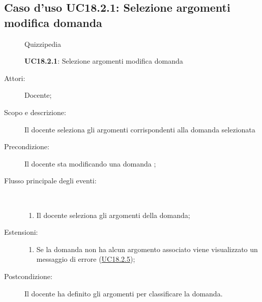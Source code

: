 \subsection{Caso d'uso UC18.2.1: Selezione argomenti modifica domanda}
\begin{figure}[H]
	\centering
	\begin{resizedtikzpicture}{\textwidth}
		\begin{umlsystem}[x=0, fill=lightgray!20]{Quizzipedia}
		\end{umlsystem}
	\end{resizedtikzpicture}
	\caption{\textbf{UC18.2.1}: Selezione argomenti modifica domanda}
	\label{UC18.2.1}
\end{figure}
\begin{description}
	\item[Attori:] Docente;
	\item[Scopo e descrizione:] Il docente seleziona gli argomenti corrispondenti alla domanda selezionata
	\item[Precondizione:] Il docente sta modificando una domanda
	;
	
	\item[Flusso principale degli eventi:] \ 
	\begin{enumerate}
		\item Il docente seleziona gli argomenti della domanda;
		
	\end{enumerate}
	\item[Estensioni:]
	\begin{enumerate}
		\item Se la domanda non ha alcun argomento associato viene visualizzato un messaggio di errore	 (\hyperlink{UC18.2.5}{UC18.2.5});
		
	\end{enumerate}
	\item[Postcondizione:] Il docente ha definito gli argomenti per classificare la domanda.
\end{description}
\hypertarget{UC18.2.2}{}
